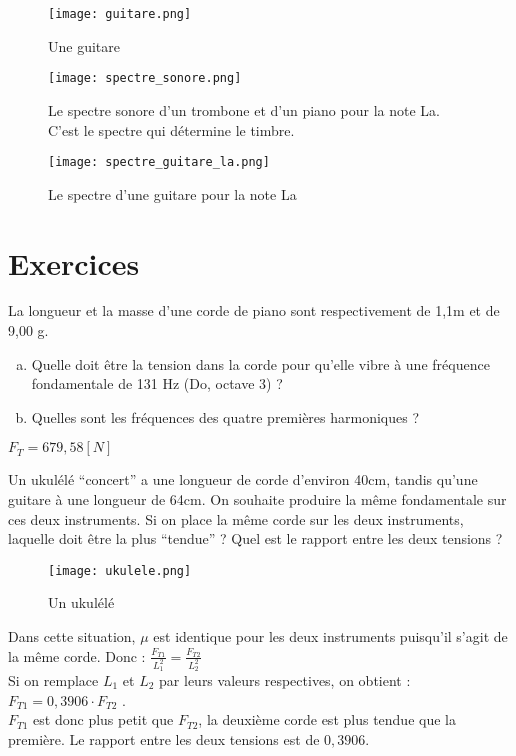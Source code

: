 \begin{figure}[ht!]
    \centering
    \texttt{[image: guitare.png]}
    \caption{Une guitare}
\end{figure}

\newpage

\begin{figure}[ht!]
    \texttt{[image: spectre\_sonore.png]}
    \caption{Le spectre sonore d'un trombone et d'un piano pour la note La. C'est le spectre qui détermine le timbre.}
\end{figure}

\begin{figure}[ht!]
    \texttt{[image: spectre\_guitare\_la.png]}
    \caption{Le spectre d'une guitare pour la note La}
\end{figure}

\newpage

\section{Exercices}
\begin{exercise}
    La longueur et la masse d'une corde de piano sont respectivement de 1,1m et de 9,00 g.
    \begin{enumerate}[a)]
        \item Quelle doit être la tension dans la corde pour qu'elle vibre à une fréquence fondamentale de 131 Hz (Do, octave 3) ?
        \item Quelles sont les fréquences des quatre premières harmoniques ?
    \end{enumerate}
\end{exercise}
\begin{solution}
    \(F_T=679,58[N]\)
\end{solution}

\begin{exercise}
    Un ukulélé \enquote{concert} a une longueur de corde d'environ 40cm, tandis qu'une guitare à une longueur de 64cm. On souhaite produire la même fondamentale sur ces deux instruments. Si on place la même corde sur les deux instruments, laquelle doit être la plus \enquote{tendue} ? Quel est le rapport entre les deux tensions ?
    \begin{figure}[ht!]
        \centering
        \texttt{[image: ukulele.png]}
        \caption{Un ukulélé}
    \end{figure}
\end{exercise}
\begin{solution}
    Dans cette situation, \(\mu\) est identique pour les deux instruments puisqu'il s'agit de la même corde. Donc :
    \(\frac{F_{T1}}{L_1 ^2}=\frac{F_{T2}}{L_2 ^2}\) \\
    Si on remplace \(L_1\) et \(L_2\) par leurs valeurs respectives, on obtient :\\
    \(F_{T1}=0,3906 \cdot F_{T2}\) .\\
    \(F_{T1}\) est donc plus petit que \(F_{T2}\), la deuxième corde est plus tendue que la première. Le rapport entre les deux tensions est de \(0,3906\).
\end{solution}


